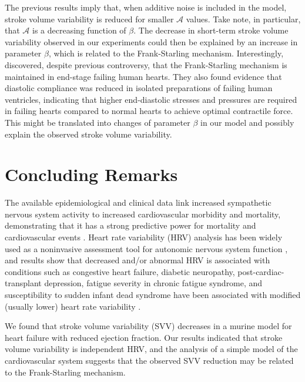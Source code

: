 \documentclass[%
preprint,
 amsmath,amssymb,
 aps,
]{revtex4-2}
\begin{document}
The previous results imply that, when additive noise is included in the model, stroke volume variability is reduced for smaller $\mathcal{A}$ values. Take note, in particular, that $\mathcal{A}$ is a decreasing function of $\beta$. The decrease in short-term stroke volume variability observed in our experiments could then be explained by an increase in parameter $\beta$, which is related to the Frank-Starling mechanism. Interestingly, \citet{Holubarsch_1996} discovered, despite previous controversy, that the Frank-Starling mechanism is maintained in end-stage failing human hearts. They also found evidence that diastolic compliance was reduced in isolated preparations of failing human ventricles, indicating that higher end-diastolic stresses and pressures are required in failing hearts compared to normal hearts to achieve optimal contractile force. This might be translated into changes of parameter $\beta$ in our model and possibly explain the observed stroke volume variability.

\section{Concluding Remarks}

The available epidemiological and clinical data link increased sympathetic nervous system activity to increased cardiovascular morbidity and mortality, demonstrating that it has a strong predictive power for mortality and cardiovascular events \citep{Malpas_2010}. Heart rate variability (HRV) analysis has been widely used as a noninvasive assessment tool for autonomic nervous system function \citep{Kiyono_2016}, and results show that decreased and/or abnormal HRV is associated with conditions such as congestive heart failure, diabetic neuropathy, post-cardiac-transplant depression, fatigue severity in chronic fatigue syndrome, and susceptibility to sudden infant dead syndrome have been associated with modified (usually lower) heart rate variability \citep{Kamen_1995, Rajendra_Acharya_2006, Zeki_Al_Hazzouri_2014, Escorihuela_2020}. 

We found that stroke volume variability (SVV) decreases in a murine model for heart failure with reduced ejection fraction. Our results indicated that stroke volume variability is independent HRV, and the analysis of a simple model of the cardiovascular system suggests that the observed SVV reduction may be related to the Frank-Starling mechanism.
\end{document}
